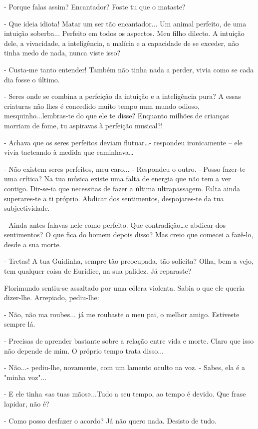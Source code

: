 - Porque falas assim? Encantador? Foste tu que o mataste?

- Que ideia idiota! Matar um ser tão encantador... Um animal perfeito,
de uma intuição soberba... Perfeito em todos os aspectos. Meu filho
dilecto. A intuição dele, a vivacidade, a inteligência, a malícia e a
capacidade de se exceder, não tinha medo de nada, nunca viste isso?

- Custa-me tanto entender! Também não tinha nada a perder, vivia como se
cada dia fosse o último.

- Seres onde se combina a perfeição da intuição e a inteligência pura? A
essas criaturas não lhes é concedido muito tempo num mundo odioso,
mesquinho...lembras-te do que ele te disse? Enquanto milhões de crianças
morriam de fome, tu aspiravas à perfeição musical?!

- Achava que os seres perfeitos deviam flutuar\ldots{}- respondeu
ironicamente -- ele vivia tacteando à medida que caminhava\ldots{}

- Não existem seres perfeitos, meu caro... - Respondeu o outro. - Posso
fazer-te uma crítica? Na tua música existe uma falta de energia que não
tem a ver contigo. Dir-se-ia que necessitas de fazer a última
ultrapassagem. Falta ainda superares-te a ti próprio. Abdicar dos
sentimentos, despojares-te da tua subjectividade.

- Ainda antes falavas nele como perfeito. Que contradição\ldots{}e
abdicar dos sentimentos? O que fica do homem depois disso? Mas creio que
comecei a fazê-lo, desde a sua morte.

- Tretas! A tua Guidinha, sempre tão preocupada, tão solícita? Olha, bem
a vejo, tem qualquer coisa de Eurídice, na sua palidez. Já reparaste?

Florimundo sentiu-se assaltado por uma cólera violenta. Sabia o que ele
queria dizer-lhe. Arrepiado, pediu-lhe:

- Não, não ma roubes... já me roubaste o meu pai, o melhor amigo.
Estiveste sempre lá.

- Precisas de aprender bastante sobre a relação entre vida e morte.
Claro que isso não depende de mim. O próprio tempo trata disso...

- Não...- pediu-lhe, novamente, com um lamento oculto na voz. - Sabes,
ela é a "minha voz"...

- E ele tinha «as tuas mãos»...Tudo a seu tempo, ao tempo é devido. Que
frase lapidar, não é?

- Como posso desfazer o acordo? Já não quero nada. Desisto de tudo.

